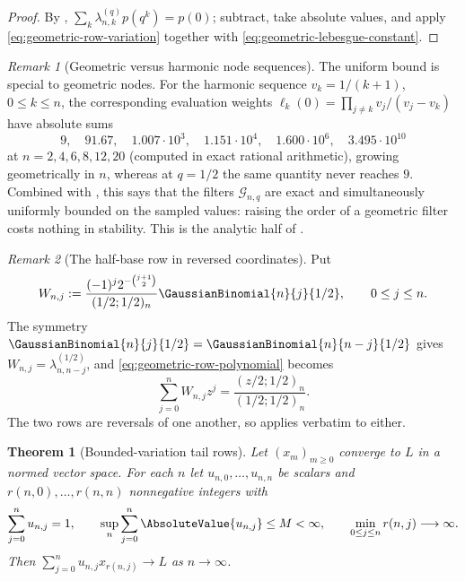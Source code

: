 \documentclass[11pt,a4paper,oneside,openany]{book}
\newtheorem{theorem}{Theorem}[chapter]
\theoremstyle{definition}
\theoremstyle{remark}
\newtheorem{remark}[remark]{Remark}
\begin{document}
\begin{proof}
By , $\sum_k\lambda^{(q)}_{n,k}p(q^k)=p(0)$;
subtract, take absolute values, and apply \eqref{eq:geometric-row-variation} together
with \eqref{eq:geometric-lebesgue-constant}.
\end{proof}

\begin{remark}[Geometric versus harmonic node sequences]\label{rem:geometric-vs-harmonic-nodes}
The uniform bound is special to geometric nodes.  For the harmonic sequence
$v_k=1/(k+1)$, $0\le k\le n$, the corresponding evaluation weights
$\ell_k(0)=\prod_{j\ne k}v_j/(v_j-v_k)$ have absolute sums
\[
 9,\quad 91.67,\quad 1.007\cdot10^{3},\quad 1.151\cdot10^{4},
 \quad 1.600\cdot10^{6},\quad 3.495\cdot10^{10}
\]
at $n=2,4,6,8,12,20$ (computed in exact rational arithmetic), growing geometrically in
$n$, whereas at $q=1/2$ the same quantity never reaches $9$.  Combined with
, this says that the filters $\mathcal G_{n,q}$ are
exact and simultaneously uniformly bounded on the sampled values: raising the order of a
geometric filter costs nothing in stability.  This is the analytic half of
.
\end{remark}

\begin{remark}[The half-base row in reversed coordinates]\label{rem:halfbase-row-reversal}
Put
\[
 W_{n,j}:=\frac{(-1)^j2^{-\binom{j+1}{2}}}{(1/2;1/2)_n}\GaussianBinomial{n}{j}{1/2},
 \qquad 0\le j\le n.
\]
The symmetry $\GaussianBinomial{n}{j}{1/2}=\GaussianBinomial{n}{n-j}{1/2}$ gives
$W_{n,j}=\lambda_{n,n-j}^{(1/2)}$, and \eqref{eq:geometric-row-polynomial} becomes
\[
 \sum_{j=0}^{n}W_{n,j}z^j=\frac{(z/2;1/2)_n}{(1/2;1/2)_n}.
\]
The two rows are reversals of one another, so  applies
verbatim to either.
\end{remark}

\begin{theorem}[Bounded-variation tail rows]\label{thm:tail-row-toeplitz}
Let $(x_m)_{m\ge0}$ converge to $L$ in a normed vector space.  For each $n$ let
$u_{n,0},\ldots,u_{n,n}$ be scalars and $r(n,0),\ldots,r(n,n)$ nonnegative integers with
\[
 \sum_{j=0}^{n}u_{n,j}=1,
 \qquad
 \sup_n\sum_{j=0}^{n}\AbsoluteValue{u_{n,j}}\le M<\infty,
 \qquad
 \min_{0\le j\le n}r(n,j)\longrightarrow\infty .
\]
Then $\sum_{j=0}^{n}u_{n,j}x_{r(n,j)}\to L$ as $n\to\infty$.
\end{theorem}
\end{document}
